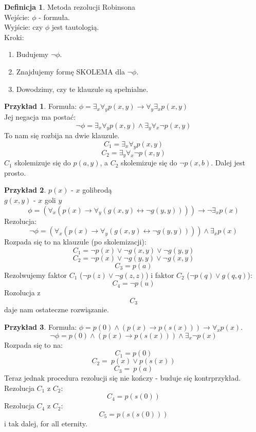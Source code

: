\documentclass[10pt,a4paper]{article}
\theoremstyle{plain}
\theoremstyle{definition}
\newtheorem*{definition}{Definicja}
\newtheorem*{example}{Przykład}
\begin{document}
\begin{definition}
 Metoda rezolucji Robinsona\\
Wejście: $\phi$ - formuła.\\
Wyjście: czy $\phi$ jest tautologią.\\
Kroki:
\begin{enumerate}
 \item Budujemy $\lnot \phi$.
 \item Znajdujemy formę SKOLEMA dla $\lnot \phi$.
 \item Dowodzimy, czy te klauzule są spełnialne.
\end{enumerate}
\end{definition}
\begin{example}
 Formuła: $\phi = \exists_x \forall_y p(x,y) \to \forall_y \exists_x p(x,y)$\\
Jej negacja ma postać:
$$\lnot \phi = \exists_x \forall_y p(x,y) \wedge \exists_y \forall_x \lnot p(x,y)$$
To nam się rozbija na dwie klauzule.
$$C_1 = \exists_x \forall_y p(x,y)$$
$$C_2 = \exists_y \forall_x \lnot p(x,y)$$
$C_1$ skolemizuje się do $p(a, y)$, a $C_2$ skolemizuje się do $\lnot p(x, b)$.
Dalej jest prosto.
\end{example}
\begin{example}
$p(x)$ - $x$ golibrodą\\
$g(x,y)$ - $x$ goli $y$\\
$$\phi = (\forall_x (p(x) \to \forall_y(g(x,y) \leftrightarrow \lnot g(y,y)))) \to \lnot \exists_x p(x)$$
Rezolucja:
$$\lnot \phi = (\forall_x (p(x) \to \forall_y(g(x,y) \leftrightarrow \lnot g(y,y)))) \wedge \exists_x p(x)$$
Rozpada się to na klauzule (po skolemizacji):
$$C_1 = \lnot p(x) \vee \lnot g(x,y) \vee \lnot g(y,y)$$
$$C_2 = \lnot p(x) \vee \lnot g(y,y) \vee \lnot g(x,y)$$
$$C_3 = p(a)$$
Rezolwujemy faktor $C_1$ ($\lnot p(z) \vee \lnot g(z,z)$) i faktor $C_2$ ($\lnot p(q) \vee g(q,q)$):
$$C_4 = \lnot p(u)$$
Rozolucja z $$C_3$$ daje nam ostateczne rozwiązanie.
\end{example}
\begin{example}
Formuła: $\phi = p(0) \wedge (p(x) \to p(s(x))) \to \forall_x p(x)$.
$$\lnot \phi = p(0) \wedge (p(x) \to p(s(x))) \wedge \exists_x \lnot p(x)$$
Rozpada się to na:
$$C_1 = p(0)$$
$$C_2 = ~p(x) \vee p(s(x))$$
$$C_3 = ~p(a)$$
Teraz jednak procedura rezolucji się nie kończy - buduje się kontrprzykład.\\
Rezolucja $C_1$ z $C_2$:
$$C_4 = p(s(0))$$
Rezolucja $C_4$ z $C_2$:
$$C_5 = p(s(s(0)))$$
i tak dalej, for all eternity.
\end{example}
\end{document}
